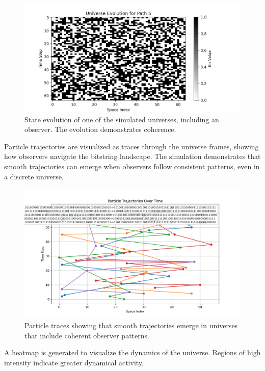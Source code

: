 \documentclass[12pt]{article}
\begin{document}
\begin{figure}[h!]
    \centering
    \includegraphics[width=1.0\textwidth]{figures/state_evolution_heatmap.png}
    \caption{State evolution of one of the simulated universes, including an observer. The evolution demonstrates coherence.}
    \label{fig:state_evolution}
\end{figure}

Particle trajectories are visualized as traces through the universe frames, showing how observers navigate the bitstring landscape. The simulation demonstrates that smooth trajectories can emerge when observers follow consistent patterns, even in a discrete universe.

\begin{figure}[h!]
    \centering
    \includegraphics[width=1.0\textwidth]{figures/particle_trajectories.png}
    \caption{Particle traces showing that smooth trajectories emerge in universes that include coherent observer patterns.}
    \label{fig:particle_trajectories}
\end{figure}

A heatmap is generated to visualize the dynamics of the universe. Regions of high intensity indicate greater dynamical activity.
\end{document}
